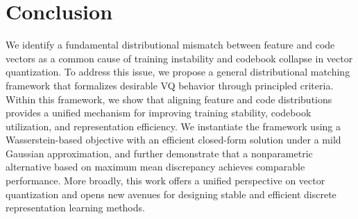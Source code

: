 \section{Conclusion}\label{sec:conclusion}


We identify a fundamental distributional mismatch between feature and code vectors as a common cause of training instability and codebook collapse in vector quantization. To address this issue, we propose a general distributional matching framework that formalizes desirable VQ behavior through principled criteria. Within this framework, we show that aligning feature and code distributions provides a unified mechanism for improving training stability, codebook utilization, and representation efficiency. We instantiate the framework using a Wasserstein-based objective with an efficient closed-form solution under a mild Gaussian approximation, and further demonstrate that a nonparametric alternative based on maximum mean discrepancy achieves comparable performance. More broadly, this work offers a unified perspective on vector quantization and opens new avenues for designing stable and efficient discrete representation learning methods.

